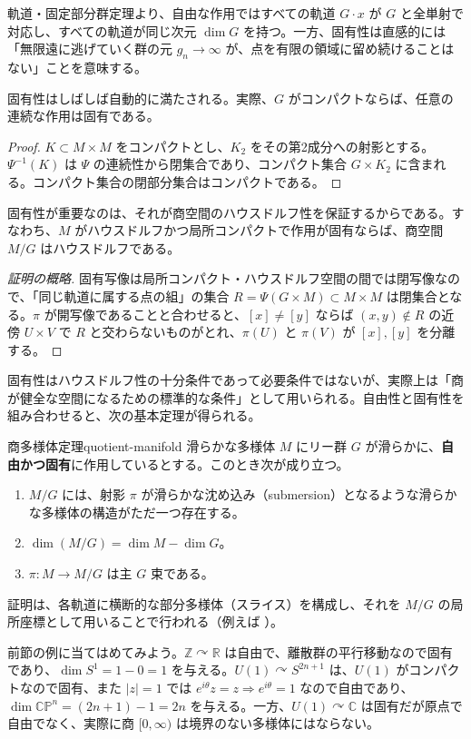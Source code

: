 \documentclass[uplatex, dvipdfmx, book]{jsbook}
\begin{document}
軌道・固定部分群定理より、自由な作用ではすべての軌道 $G \cdot x$ が $G$ と全単射で対応し、すべての軌道が同じ次元 $\dim G$ を持つ。一方、固有性は直感的には「無限遠に逃げていく群の元 $g_n \to \infty$ が、点を有限の領域に留め続けることはない」ことを意味する。

固有性はしばしば自動的に満たされる。実際、$G$ がコンパクトならば、任意の連続な作用は固有である。
\begin{proof}
$K \subset M \times M$ をコンパクトとし、$K_2$ をその第2成分への射影とする。$\Psi^{-1}(K)$ は $\Psi$ の連続性から閉集合であり、コンパクト集合 $G \times K_2$ に含まれる。コンパクト集合の閉部分集合はコンパクトである。
\end{proof}

固有性が重要なのは、それが商空間のハウスドルフ性を保証するからである。すなわち、$M$ がハウスドルフかつ局所コンパクトで作用が固有ならば、商空間 $M/G$ はハウスドルフである。
\begin{proof}[証明の概略]
固有写像は局所コンパクト・ハウスドルフ空間の間では閉写像なので、「同じ軌道に属する点の組」の集合 $R = \Psi(G \times M) \subset M \times M$ は閉集合となる。$\pi$ が開写像であることと合わせると、$[x] \neq [y]$ ならば $(x, y) \notin R$ の近傍 $U \times V$ で $R$ と交わらないものがとれ、$\pi(U)$ と $\pi(V)$ が $[x], [y]$ を分離する。
\end{proof}

固有性はハウスドルフ性の十分条件であって必要条件ではないが、実際上は「商が健全な空間になるための標準的な条件」として用いられる。自由性と固有性を組み合わせると、次の基本定理が得られる。

\begin{mythm}{商多様体定理}{quotient-manifold}
滑らかな多様体 $M$ にリー群 $G$ が滑らかに、\textbf{自由かつ固有}に作用しているとする。このとき次が成り立つ。
\begin{enumerate}
    \item $M/G$ には、射影 $\pi$ が滑らかな沈め込み（submersion）となるような滑らかな多様体の構造がただ一つ存在する。
    \item $\dim (M/G) = \dim M - \dim G$。
    \item $\pi: M \to M/G$ は主 $G$ 束である。
\end{enumerate}
\end{mythm}

証明は、各軌道に横断的な部分多様体（スライス）を構成し、それを $M/G$ の局所座標として用いることで行われる（例えば \cite[Thm.~21.10]{lee2013}）。

前節の例に当てはめてみよう。$\mathbb{Z} \curvearrowright \mathbb{R}$ は自由で、離散群の平行移動なので固有であり、$\dim S^1 = 1 - 0 = 1$ を与える。$U(1) \curvearrowright S^{2n+1}$ は、$U(1)$ がコンパクトなので固有、また $|z| = 1$ では $e^{i\theta}z = z \Rightarrow e^{i\theta} = 1$ なので自由であり、$\dim \mathbb{CP}^n = (2n+1) - 1 = 2n$ を与える。一方、$U(1) \curvearrowright \mathbb{C}$ は固有だが原点で自由でなく、実際に商 $[0, \infty)$ は境界のない多様体にはならない。
\end{document}

